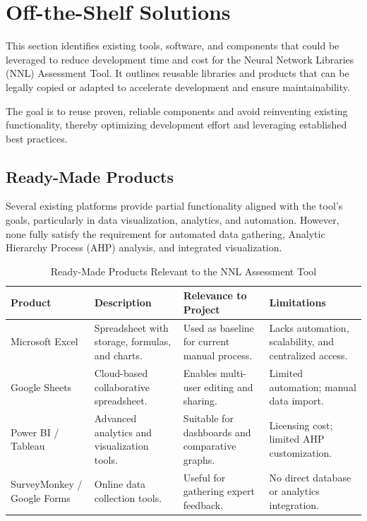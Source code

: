 \documentclass[12pt]{article}
\begin{document}
\section{Off-the-Shelf Solutions}

This section identifies existing tools, software, and components that could be leveraged to reduce development time and cost for the Neural Network Libraries (NNL) Assessment Tool. It outlines reusable libraries and products that can be legally copied or adapted to accelerate development and ensure maintainability.

The goal is to reuse proven, reliable components and avoid reinventing existing functionality, thereby optimizing development effort and leveraging established best practices.

\subsection{Ready-Made Products}

Several existing platforms provide partial functionality aligned with the tool’s goals, particularly in data visualization, analytics, and automation. However, none fully satisfy the requirement for automated data gathering, Analytic Hierarchy Process (AHP) analysis, and integrated visualization.

\begin{table}[H]
\centering
\caption{Ready-Made Products Relevant to the NNL Assessment Tool}
\setlength{\tabcolsep}{4pt}
\renewcommand{\arraystretch}{1.2}
\footnotesize

\begin{tabularx}{\textwidth}{p{3cm} Y Y Y}
\toprule
\textbf{Product} & \textbf{Description} & \textbf{Relevance to Project} & \textbf{Limitations} \\
\midrule
Microsoft Excel &
Spreadsheet with storage, formulas, and charts. &
Used as baseline for current manual process. &
Lacks automation, scalability, and centralized access. \\
\hline
Google Sheets &
Cloud-based collaborative spreadsheet. &
Enables multi-user editing and sharing. &
Limited automation; manual data import. \\
\hline
Power BI / Tableau &
Advanced analytics and visualization tools. &
Suitable for dashboards and comparative graphs. &
Licensing cost; limited AHP customization. \\
\hline
SurveyMonkey / Google Forms &
Online data collection tools. &
Useful for gathering expert feedback. &
No direct database or analytics integration. \\
\bottomrule
\end{tabularx}
\end{table}
\end{document}
